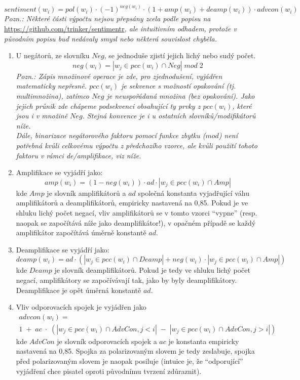 \[
sentiment(w_i)=pol(w_i)\cdot (-1)^{neg(w_i)}\cdot (1+amp(w_i)+deamp(w_i)) \cdot advcon(w_i)
\]
\emph{Pozn.: Některé části výpočtu nejsou přepsány zcela podle popisu na} \url{https://github.com/trinker/sentimentr}\emph{, ale intuitivním odhadem, protože v původním popisu buď nedávaly smysl nebo některá souvislost chyběla.}

\begin{enumerate}

\item 
U negátorů, ze slovníku $Neg$, se jednoduše zjistí jejich lichý nebo sudý počet. \\
\[
neg(w_i)=|w_j \in pcc(w_i)\cap Neg| \; mod \; 2
\]
\emph{Pozn.: 
Zápis množinové operace je zde, pro zjednodušení, vyjádřen matematicky nepřesně. 
$pcc(w_i)$ je sekvence s možností opakování (tj. multimnožina), zatímco $Neg$ je neuspořádaná množina (bez opakování).
Jako jejich průnik zde chápeme podsekvenci obsahující ty prvky z $pcc(w_i)$, které jsou i v množině $Neg$.
Stejná konvence je i u ostatních slovníků/modifikátorů níže. \\ 
Dále, binarizace negátorového faktoru pomocí funkce zbytku ($mod$) není potřebná kvůli celkovému výpočtu z předchozího vzorce, ale kvůli použití tohoto faktoru v rámci de/amplifikace, viz níže.}

\item 
Amplifikace se vyjádří jako:
\[
amp(w_i)=(1-neg(w_i)) \cdot ad \cdot |w_j \in pcc(w_i)\cap Amp|
\]
kde $Amp$ je slovník amplifikátorů a $ad$ společná konstanta vyjadřující váhu amplifikátorů a deamplifikátorů, empiricky nastavená na 0,85.
Pokud je ve shluku lichý počet negací, vliv amplifikátorů se v tomto vzorci ``vypne'' (resp. naopak se započítává níže jako deamplifikátor!), v opačném případě se každý amplifikátor započítává úměrně konstantě $ad$.

\item 
Deamplifikace se vyjádří jako:
\[
deamp(w_i)= ad \cdot (|w_j \in pcc(w_i)\cap Deamp| + neg(w_i) \cdot |w_j \in pcc(w_i)\cap Amp|)
\]
kde $Deamp$ je slovník deamplifikátorů.
Pokud je tedy ve shluku lichý počet negací, amplifikátory se započívávají tak, jako by byly deamplifikátory.
Deamplifikace je opět úměrná konstantě $ad$.
\item
Vliv odporovacích spojek je vyjádřen jako
\begin{multline*}
advcon(w_i)= \\
1\;+\;ac\; \cdot \; (|w_j \in pcc(w_i) \cap AdvCon, j<i| \; - \; |w_j \in pcc(w_i)\cap AdvCon, j>i|)
\end{multline*}
kde $AdvCon$ je slovník odporovacích spojek a $ac$ je konstanta empiricky nastavená na 0,85.
Spojka za polarizovaným slovem je tedy zeslabuje, spojka před polarizovaným slovem je naopak posiluje (intuice je, že ``odporující'' vyjádření chce pisatel oproti původnímu tvrzení zdůraznit). 

\end{enumerate}

